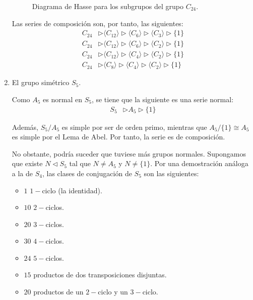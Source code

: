 \begin{ejercicio}
\begin{enumerate}
\begin{figure}
\begin{tikzpicture}[node distance=1cm]
            \end{tikzpicture}
            \caption{Diagrama de Hasse para los subgrupos del grupo $C_{24}$.}
            \label{fig:Hasse_C24}
        \end{figure}
        
        Las series de composición son, por tanto, las siguientes:
        \begin{align*}
            C_{24} &\rhd \langle C_{12} \rangle \rhd \langle C_{6} \rangle \rhd \langle C_{3} \rangle \rhd \{1\} \\
            C_{24} &\rhd \langle C_{12} \rangle \rhd \langle C_{6} \rangle \rhd \langle C_{2} \rangle \rhd \{1\} \\
            C_{24} &\rhd \langle C_{12} \rangle \rhd \langle C_{4} \rangle \rhd \langle C_{2} \rangle \rhd \{1\} \\
            C_{24} &\rhd \langle C_{8} \rangle \rhd \langle C_{4} \rangle \rhd \langle C_{2} \rangle \rhd \{1\}
        \end{align*}
        \item El grupo simétrico $S_5$.
        
        Como $A_5$ es normal en $S_5$, se tiene que la siguiente es una serie normal:
        \begin{align*}
            S_5 &\rhd A_5 \rhd \{1\}
        \end{align*}

        Además, $S_5/A_5$ es simple por ser de orden primo, mientras que $A_5/\{1\}\cong A_5$ es simple por el Lema de Abel. Por tanto, la serie es de composición.

        No obstante, podría suceder que tuviese más grupos normales. Supongamos que existe $N\lhd S_5$ tal que $N\neq A_5$ y $N\neq \{1\}$. Por una demostración análoga a la de $S_4$, las clases de conjugación de $S_5$ son las siguientes:
        \begin{itemize}
            \item $1$ $1-$ciclo (la identidad).
            \item $10$ $2-$ciclos.
            \item $20$ $3-$ciclos.
            \item $30$ $4-$ciclos.
            \item $24$ $5-$ciclos.
            \item $15$ productos de dos transposiciones disjuntas.
            \item $20$ productos de un $2-$ciclo y un $3-$ciclo.
        \end{itemize}


\end{enumerate}
\end{ejercicio}

